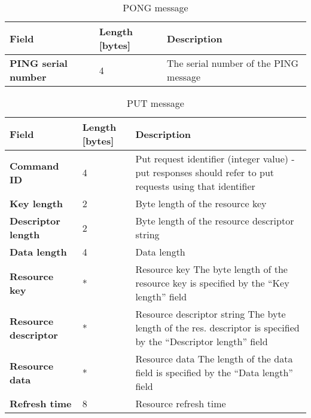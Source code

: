 \begin{table}[H]
\scriptsize
\begin{center}
\begin{tabular}{p{3cm} p{2cm} p{9.5cm}}
	\hline
	\textbf{Field}						& \textbf{Length} [bytes]				& \textbf{Description}				\\[1mm]
    \hline
    \textbf{PING serial number}			& 4										& The serial number of the PING message					\\[1.5mm]
    \hline
\end{tabular}
\end{center}
\caption{PONG message}
\label{tab:mPong}
\end{table}








\begin{table}[H]
\scriptsize
\begin{center}
\begin{tabular}{p{3cm} p{2cm} p{9.5cm}}
	\hline
	\textbf{Field}						& \textbf{Length} [bytes]				& \textbf{Description}				\\[1mm]
    \hline
    \textbf{Command ID}					& 4										& Put request identifier (integer value) - put responses should refer to put requests using that identifier					\\[1.5mm]
	\textbf{Key length}					& 2										& Byte length of the resource key					\\[1.5mm]
	\textbf{Descriptor length}			& 2										& Byte length of the resource descriptor string		\\[1.5mm]
	\textbf{Data length}				& 4										& Data length										\\[1.5mm]
	\textbf{Resource key}				& *										& Resource key \newline * The byte length of the resource key is specified by the ``Key length'' field										\\[1.5mm]
	\textbf{Resource descriptor}		& *										& Resource descriptor string \newline * The byte length of the res. descriptor is specified by the ``Descriptor length'' field			\\[1.5mm]
	\textbf{Resource data}				& *										& Resource data \newline * The length of the data field is specified by the ``Data length'' field											\\[1.5mm]
	\textbf{Refresh time}				& 8										& Resource refresh time								\\[1.5mm]
    \hline
\end{tabular}
\end{center}
\caption{PUT message}
\label{tab:mPut}
\end{table}


